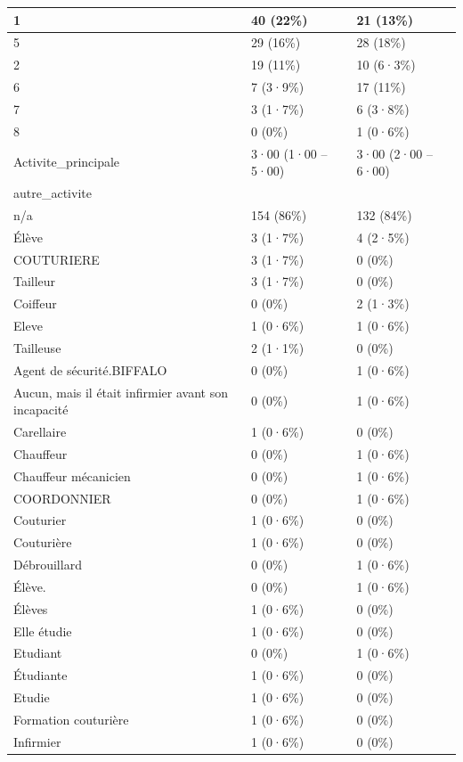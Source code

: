 \documentclass[
]{book}
\begin{document}
\begin{tabular}{l|l|l}
1 & 40 (22\%) & 21 (13\%)\\
\hline
5 & 29 (16\%) & 28 (18\%)\\
\hline
2 & 19 (11\%) & 10 (6·3\%)\\
\hline
6 & 7 (3·9\%) & 17 (11\%)\\
\hline
7 & 3 (1·7\%) & 6 (3·8\%)\\
\hline
8 & 0 (0\%) & 1 (0·6\%)\\
\hline
Activite\_principale & 3·00 (1·00 – 5·00) & 3·00 (2·00 – 6·00)\\
\hline
autre\_activite &  & \\
\hline
n/a & 154 (86\%) & 132 (84\%)\\
\hline
Élève & 3 (1·7\%) & 4 (2·5\%)\\
\hline
COUTURIERE & 3 (1·7\%) & 0 (0\%)\\
\hline
Tailleur & 3 (1·7\%) & 0 (0\%)\\
\hline
Coiffeur & 0 (0\%) & 2 (1·3\%)\\
\hline
Eleve & 1 (0·6\%) & 1 (0·6\%)\\
\hline
Tailleuse & 2 (1·1\%) & 0 (0\%)\\
\hline
Agent de sécurité.BIFFALO & 0 (0\%) & 1 (0·6\%)\\
\hline
Aucun, mais il était infirmier avant son incapacité & 0 (0\%) & 1 (0·6\%)\\
\hline
Carellaire & 1 (0·6\%) & 0 (0\%)\\
\hline
Chauffeur & 0 (0\%) & 1 (0·6\%)\\
\hline
Chauffeur mécanicien & 0 (0\%) & 1 (0·6\%)\\
\hline
COORDONNIER & 0 (0\%) & 1 (0·6\%)\\
\hline
Couturier & 1 (0·6\%) & 0 (0\%)\\
\hline
Couturière & 1 (0·6\%) & 0 (0\%)\\
\hline
Débrouillard & 0 (0\%) & 1 (0·6\%)\\
\hline
Élève. & 0 (0\%) & 1 (0·6\%)\\
\hline
Élèves & 1 (0·6\%) & 0 (0\%)\\
\hline
Elle étudie & 1 (0·6\%) & 0 (0\%)\\
\hline
Etudiant & 0 (0\%) & 1 (0·6\%)\\
\hline
Étudiante & 1 (0·6\%) & 0 (0\%)\\
\hline
Etudie & 1 (0·6\%) & 0 (0\%)\\
\hline
Formation couturière & 1 (0·6\%) & 0 (0\%)\\
\hline
Infirmier & 1 (0·6\%) & 0 (0\%)\\

\end{tabular}
\end{document}
